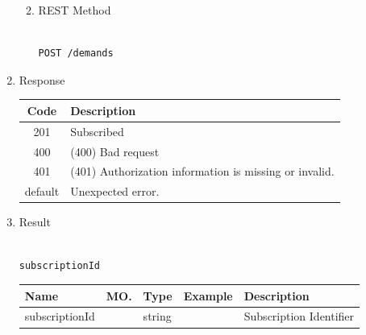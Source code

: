 \begin{enumerate}
\begin{enumerate}
\begin{center}
\begin{tabular}{|p{3cm}|l|p{3cm}|p{3cm}|p{4cm}|}
\hline

\end{tabular}
\end{center}

\item REST Method

\begin{tcolorbox}[boxrule=0pt, frame empty]
\begin{verbatim} 

POST /demands

\end{verbatim}
\end{tcolorbox}

\end{enumerate}

\item Response

\begin{center}
\begin{tabular}{|c|l|} 
\hline
\rowcolor{lightgray}	Code 		& 	Description \\
\hline
201	 		&	Subscribed \\
\hline
400			&	(400) Bad request \\
\hline
401			&	(401) Authorization information is missing or invalid. \\
\hline
default		&	Unexpected error. \\
\hline
\end{tabular}
\end{center}


\item Result

\begin{tcolorbox}[boxrule=0pt, frame empty]
\begin{verbatim}

subscriptionId

\end{verbatim}
\end{tcolorbox}

\begin{center}
\begin{tabular}{|p{3cm}|l|p{3cm}|p{3cm}|p{4cm}|} 
\hline
\rowcolor{lightgray}	Name	& MO.	& Type	& Example & 	Description \\
\hline

subscriptionId	&	& 	string	&		&	Subscription Identifier \\ 

\hline

\end{tabular}
\end{center}



\end{enumerate}
